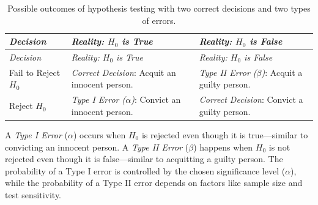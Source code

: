 \documentclass[
  11pt,
]{book}
\theoremstyle{definition}
\theoremstyle{definition}
\theoremstyle{definition}
\theoremstyle{definition}
\theoremstyle{remark}
\begin{document}
\begin{longtable}[]{@{}
  >{\raggedright\arraybackslash}p{}
  >{\raggedright\arraybackslash}p{}
  >{\raggedright\arraybackslash}p{}@{}}
\caption{\label{tab:hypothesis-errors} Possible outcomes of hypothesis testing with two correct decisions and two types of errors.}\tabularnewline
\toprule\noalign{}
\begin{minipage}[b]{\linewidth}\raggedright
\emph{Decision}
\end{minipage} & \begin{minipage}[b]{\linewidth}\raggedright
\emph{Reality: \(H_0\) is True}
\end{minipage} & \begin{minipage}[b]{\linewidth}\raggedright
\emph{Reality: \(H_0\) is False}
\end{minipage} \\
\midrule\noalign{}
\endfirsthead
\toprule\noalign{}
\begin{minipage}[b]{\linewidth}\raggedright
\emph{Decision}
\end{minipage} & \begin{minipage}[b]{\linewidth}\raggedright
\emph{Reality: \(H_0\) is True}
\end{minipage} & \begin{minipage}[b]{\linewidth}\raggedright
\emph{Reality: \(H_0\) is False}
\end{minipage} \\
\midrule\noalign{}
\endhead
\bottomrule\noalign{}
\endlastfoot
Fail to Reject \(H_0\) & {\emph{Correct Decision}: Acquit an innocent person.} & {\emph{Type II Error (\(\beta\))}: Acquit a guilty person.} \\
Reject \(H_0\) & {\emph{Type I Error (\(\alpha\))}: Convict an innocent person.} & {\emph{Correct Decision}: Convict a guilty person.} \\
\end{longtable}

A \emph{Type I Error} (\(\alpha\)) occurs when \(H_0\) is rejected even though it is true---similar to convicting an innocent person. A \emph{Type II Error} (\(\beta\)) happens when \(H_0\) is not rejected even though it is false---similar to acquitting a guilty person. The probability of a Type I error is controlled by the chosen significance level (\(\alpha\)), while the probability of a Type II error depends on factors like sample size and test sensitivity.
\end{document}
